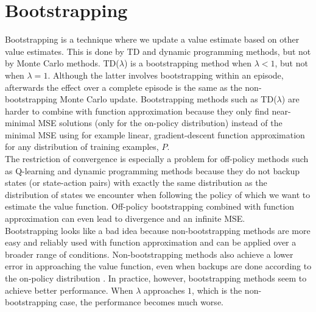 \section{Bootstrapping}
\label{sec:rl:bootstrapping}
Bootstrapping is a technique where we update a value estimate based on other value estimates.
This is done by TD and dynamic programming methods, but not by Monte Carlo methods.
TD($\lambda$) is a bootstrapping method when $\lambda <1$, but not when $\lambda = 1$.
Although the latter involves bootstrapping within an episode, afterwards the effect over a complete episode is the same as the non-bootstrapping Monte Carlo update.
Bootstrapping methods such as TD($\lambda$) are harder to combine with function approximation because they only find near-minimal MSE solutions (only for the on-policy distribution) instead of the minimal MSE using for example linear, gradient-descent function approximation for any distribution of training examples, $P$.\\
The restriction of convergence is especially a problem for off-policy methods such as Q-learning and dynamic programming methods because they do not backup states (or state-action pairs) with exactly the same distribution as the distribution of states we encounter when following the policy of which we want to estimate the value function.
Off-policy bootstrapping combined with function approximation can even lead to divergence and an infinite MSE.\\

Bootstrapping looks like a bad idea because non-bootstrapping methods are more easy and reliably used with function approximation and can be applied over a broader range of conditions.
Non-bootstrapping methods also achieve a lower error in approaching the value function, even when backups are done according to the on-policy distribution \parencite{ML}.
In practice, however, bootstrapping methods seem to achieve better performance. When $\lambda$ approaches $1$, which is the non-bootstrapping case, the performance becomes much worse.
